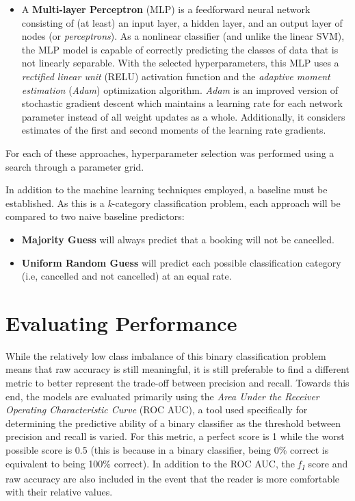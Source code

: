 \documentclass[10pt,conference]{IEEEtran}
\begin{document}
\begin{itemize}
    \item A \textbf{Multi-layer Perceptron} (MLP) is a feedforward neural network consisting of (at least) an input layer, a hidden layer, and an output layer of nodes (or \emph{perceptrons}). As a nonlinear classifier (and unlike the linear SVM), the MLP model is capable of correctly predicting the classes of data that is not linearly separable. With the selected hyperparameters, this MLP uses a \emph{rectified linear unit} (RELU) activation function and the \emph{adaptive moment estimation} (\emph{Adam}) optimization algorithm. \emph{Adam} is an improved version of stochastic gradient descent which maintains a learning rate for each network parameter instead of all weight updates as a whole\cite{Kingma2015AdamAM}. Additionally, it considers estimates of the first and second moments of the learning rate gradients\cite{Kingma2015AdamAM}.
  \end{itemize}
  For each of these approaches, hyperparameter selection was performed using a search through a parameter grid.

  In addition to the machine learning techniques employed, a baseline must be established. As this is a \emph{k}-category classification problem, each approach will be compared to two naive baseline predictors:
  \begin{itemize}
    \item \textbf{Majority Guess} will always predict that a booking will not be cancelled.
    \item \textbf{Uniform Random Guess} will predict each possible classification category (i.e, cancelled and not cancelled) at an equal rate.
  \end{itemize}
  

\section{Evaluating Performance}
 While the relatively low class imbalance of this binary classification problem means that raw accuracy is still meaningful, it is still preferable to find a different metric to better represent the trade-off between precision and recall. Towards this end, the models are evaluated primarily using the \emph{Area Under the Receiver Operating Characteristic Curve} (ROC AUC), a tool used specifically for determining the predictive ability of a binary classifier as the threshold between precision and recall is varied\cite{Fawcett2006}. For this metric, a perfect score is 1 while the worst possible score is 0.5 (this is because in a binary classifier, being 0\% correct is equivalent to being 100\% correct). In addition to the ROC AUC, the \emph{f\textsubscript{1}} score\cite{rijsbergen_1995} and raw accuracy are also included in the event that the reader is more comfortable with their relative values.
 
\end{document}
